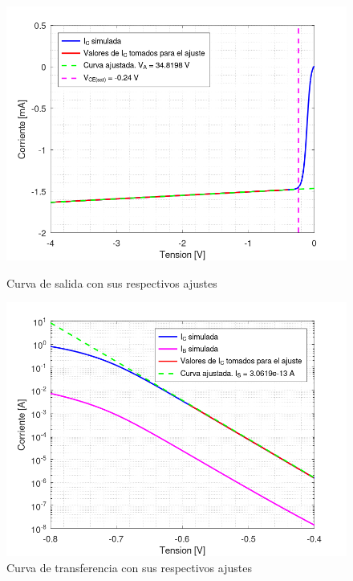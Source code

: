 \documentclass[10pt]{article}
\begin{document}
\begin{figure}[ht!]
\begin{minipage}{.5\textwidth}
\centering
\includegraphics[width=1.1\linewidth]{resources/grafico_curva_de_salida.png}
\caption{Curva de salida con sus respectivos ajustes}
\label{fig:grafico_curva_de_salida}
\end{minipage}
\begin{minipage}{.5\textwidth}
\centering
\includegraphics[width=1.1\linewidth]{resources/grafico_curva_transferencia.png}
\caption{Curva de transferencia con sus respectivos ajustes}
\label{fig:grafico_curva_de_transferencia}
\end{minipage}
\end{figure}
\end{document}
